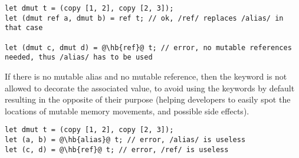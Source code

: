 \begin{lstlisting}[style=coloredverbatim, escapechar=@]
let dmut t = (copy [1, 2], copy [2, 3]);
let (dmut ref a, dmut b) = ref t; // ok, /ref/ replaces /alias/ in that case

let (dmut c, dmut d) = @\hb{ref}@ t; // error, no mutable references needed, thus /alias/ has to be used
\end{lstlisting}

If there is no mutable alias and no mutable reference, then the keyword is not
allowed to decorate the associated value, to avoid using the keywords by default
resulting in the opposite of their purpose (helping developers to easily spot
the locations of mutable memory movements, and possible side effects).

\begin{lstlisting}[style=coloredverbatim, escapechar=@]
let dmut t = (copy [1, 2], copy [2, 3]);
let (a, b) = @\hb{alias}@ t; // error, /alias/ is useless
let (c, d) = @\hb{ref}@ t; // error, /ref/ is useless
\end{lstlisting}

\vfill%
\pagebreak

